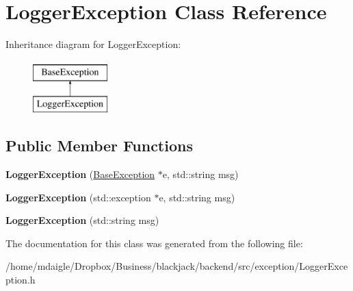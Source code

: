 \hypertarget{classLoggerException}{
\section{\-Logger\-Exception \-Class \-Reference}
\label{de/d27/classLoggerException}
}
\-Inheritance diagram for \-Logger\-Exception\-:\begin{figure}[H]
\begin{center}
\leavevmode
\includegraphics[height=2.000000cm]{de/d27/classLoggerException}
\end{center}
\end{figure}
\subsection*{\-Public \-Member \-Functions}
\begin{DoxyCompactItemize}
\item 
\hypertarget{classLoggerException_a9020de012158cb1a60f0afb4f480ccae}{
{\bfseries \-Logger\-Exception} (\hyperlink{classBaseException}{\-Base\-Exception} $\ast$e, std\-::string msg)}
\label{de/d27/classLoggerException_a9020de012158cb1a60f0afb4f480ccae}

\item 
\hypertarget{classLoggerException_a3ae0a9072ae2947d0a99aaba41ba8429}{
{\bfseries \-Logger\-Exception} (std\-::exception $\ast$e, std\-::string msg)}
\label{de/d27/classLoggerException_a3ae0a9072ae2947d0a99aaba41ba8429}

\item 
\hypertarget{classLoggerException_af187d81db3cf6fccce46ea4849d47ee7}{
{\bfseries \-Logger\-Exception} (std\-::string msg)}
\label{de/d27/classLoggerException_af187d81db3cf6fccce46ea4849d47ee7}

\end{DoxyCompactItemize}


\-The documentation for this class was generated from the following file\-:\begin{DoxyCompactItemize}
\item 
/home/mdaigle/\-Dropbox/\-Business/blackjack/backend/src/exception/\-Logger\-Exception.\-h\end{DoxyCompactItemize}
